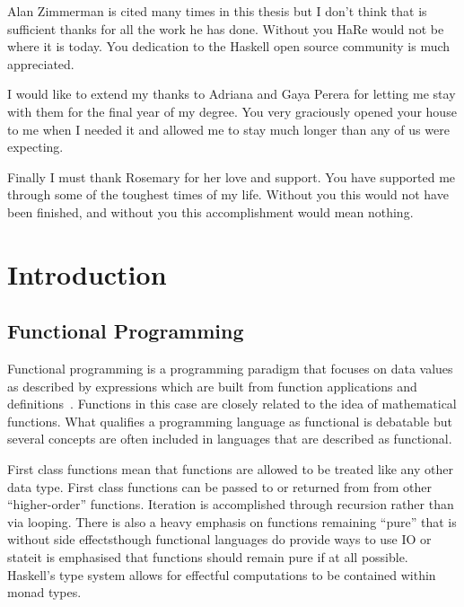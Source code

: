\begin{preface}
Alan Zimmerman is cited many times in this thesis but I don't think that is sufficient thanks for all the work he has done. Without you HaRe would not be where it is today. You dedication to the Haskell open source community is much appreciated.

I would like to extend my thanks to Adriana and Gaya Perera for letting me stay with them for the final year of my degree. You very graciously opened your house to me when I needed it and allowed me to stay much longer than any of us were expecting.

Finally I must thank Rosemary for her love and support. You have supported me through some of the toughest times of my life. Without you this would not have been finished, and without you this accomplishment would mean nothing.

\end{preface}

\chapter{Introduction}\label{chp:intro}


\section{Functional Programming}
Functional programming is a programming paradigm that focuses on data values as described by expressions which are built from function applications and definitions~\citep{elementsOfFunc}.  Functions in this case are closely related to the idea of mathematical functions. What qualifies a programming language as functional is debatable but several concepts are often included in languages that are described as functional. 

First class functions mean that functions are allowed to be treated like any other data type. First class functions can be passed to or returned from from other ``higher-order'' functions. Iteration is accomplished through recursion rather than via looping. There is also a heavy emphasis on functions remaining ``pure\DIFaddbegin \DIFadd{,}\DIFaddend '' that is without side effects\DIFdelbegin \DIFdel{, }\DIFdelend \DIFaddbegin \DIFadd{; }\DIFaddend though functional languages do provide ways to use IO or state\DIFaddbegin \DIFadd{, }\DIFaddend it is emphasised that functions should remain pure if at all possible. Haskell's type system allows for effectful computations to be contained within monad types.

